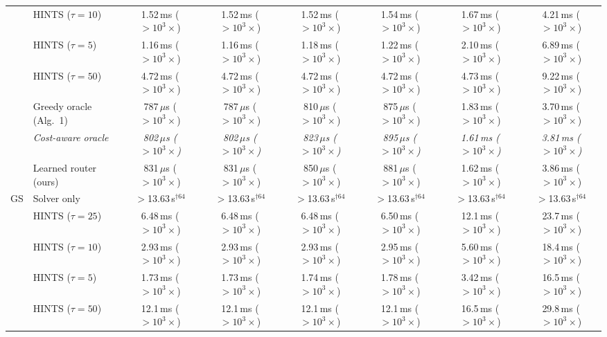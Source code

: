 {\begin{tabular}{llcccccc}
 & HINTS ($\tau{=}10$) & 1.52\,ms ($>10^{3}\times$) & 1.52\,ms ($>10^{3}\times$) & 1.52\,ms ($>10^{3}\times$) & 1.54\,ms ($>10^{3}\times$) & 1.67\,ms ($>10^{3}\times$) & 4.21\,ms ($>10^{3}\times$) \\
 & HINTS ($\tau{=}5$) & 1.16\,ms ($>10^{3}\times$) & 1.16\,ms ($>10^{3}\times$) & 1.18\,ms ($>10^{3}\times$) & 1.22\,ms ($>10^{3}\times$) & 2.10\,ms ($>10^{3}\times$) & 6.89\,ms ($>10^{3}\times$) \\
 & HINTS ($\tau{=}50$) & 4.72\,ms ($>10^{3}\times$) & 4.72\,ms ($>10^{3}\times$) & 4.72\,ms ($>10^{3}\times$) & 4.72\,ms ($>10^{3}\times$) & 4.73\,ms ($>10^{3}\times$) & 9.22\,ms ($>10^{3}\times$) \\
 & Greedy oracle (Alg.~1) & 787\,$\mu$s ($>10^{3}\times$) & 787\,$\mu$s ($>10^{3}\times$) & 810\,$\mu$s ($>10^{3}\times$) & 875\,$\mu$s ($>10^{3}\times$) & 1.83\,ms ($>10^{3}\times$) & 3.70\,ms ($>10^{3}\times$) \\
 & \textit{Cost-aware oracle} & \textit{802\,$\mu$s ($>10^{3}\times$)} & \textit{802\,$\mu$s ($>10^{3}\times$)} & \textit{823\,$\mu$s ($>10^{3}\times$)} & \textit{895\,$\mu$s ($>10^{3}\times$)} & \textit{1.61\,ms ($>10^{3}\times$)} & \textit{3.81\,ms ($>10^{3}\times$)} \\
 & Learned router (ours) & 831\,$\mu$s ($>10^{3}\times$) & 831\,$\mu$s ($>10^{3}\times$) & 850\,$\mu$s ($>10^{3}\times$) & 881\,$\mu$s ($>10^{3}\times$) & 1.62\,ms ($>10^{3}\times$) & 3.86\,ms ($>10^{3}\times$) \\
\midrule
GS & Solver only & $>$13.63\,s$^{\dagger 64}$ & $>$13.63\,s$^{\dagger 64}$ & $>$13.63\,s$^{\dagger 64}$ & $>$13.63\,s$^{\dagger 64}$ & $>$13.63\,s$^{\dagger 64}$ & $>$13.63\,s$^{\dagger 64}$ \\
 & HINTS ($\tau{=}25$) & 6.48\,ms ($>10^{3}\times$) & 6.48\,ms ($>10^{3}\times$) & 6.48\,ms ($>10^{3}\times$) & 6.50\,ms ($>10^{3}\times$) & 12.1\,ms ($>10^{3}\times$) & 23.7\,ms ($>10^{3}\times$) \\
 & HINTS ($\tau{=}10$) & 2.93\,ms ($>10^{3}\times$) & 2.93\,ms ($>10^{3}\times$) & 2.93\,ms ($>10^{3}\times$) & 2.95\,ms ($>10^{3}\times$) & 5.60\,ms ($>10^{3}\times$) & 18.4\,ms ($>10^{3}\times$) \\
 & HINTS ($\tau{=}5$) & 1.73\,ms ($>10^{3}\times$) & 1.73\,ms ($>10^{3}\times$) & 1.74\,ms ($>10^{3}\times$) & 1.78\,ms ($>10^{3}\times$) & 3.42\,ms ($>10^{3}\times$) & 16.5\,ms ($>10^{3}\times$) \\
 & HINTS ($\tau{=}50$) & 12.1\,ms ($>10^{3}\times$) & 12.1\,ms ($>10^{3}\times$) & 12.1\,ms ($>10^{3}\times$) & 12.1\,ms ($>10^{3}\times$) & 16.5\,ms ($>10^{3}\times$) & 29.8\,ms ($>10^{3}\times$) \\

\end{tabular}}
